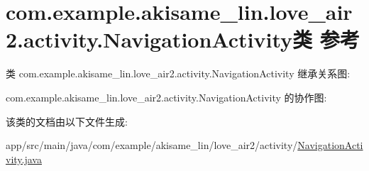 \hypertarget{classcom_1_1example_1_1akisame__lin_1_1love__air2_1_1activity_1_1_navigation_activity}{}\section{com.\+example.\+akisame\+\_\+lin.\+love\+\_\+air2.\+activity.\+Navigation\+Activity类 参考}
\label{classcom_1_1example_1_1akisame__lin_1_1love__air2_1_1activity_1_1_navigation_activity}


类 com.\+example.\+akisame\+\_\+lin.\+love\+\_\+air2.\+activity.\+Navigation\+Activity 继承关系图\+:


com.\+example.\+akisame\+\_\+lin.\+love\+\_\+air2.\+activity.\+Navigation\+Activity 的协作图\+:


该类的文档由以下文件生成\+:\begin{DoxyCompactItemize}
\item 
app/src/main/java/com/example/akisame\+\_\+lin/love\+\_\+air2/activity/\mbox{\hyperlink{_navigation_activity_8java}{Navigation\+Activity.\+java}}\end{DoxyCompactItemize}
